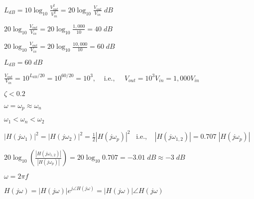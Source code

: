 \documentclass{article}
\def\lthtmlcheckvsize{\ifdim\ht\sizebox<\vsize 
  \ifdim\wd\sizebox<\hsize\expandafter\hfill\fi \expandafter\vfill
  \else\expandafter\vss\fi}%
\begin{document}
{\newpage\clearpage
{}%
$\displaystyle L_{dB}=10 \log_{10} \frac{V^2_{out}}{V^2_{in}}
=20 \log_{10} \frac{V_{out}}{V_{in}}\;dB $%
\lthtmlindisplaymathZ
\lthtmlcheckvsize\clearpage}

{\newpage\clearpage
{}%
$\displaystyle 20 \log_{10} \frac{V_{out}}{V_{in}}=20 \log_{10} \frac{1,000}{10}=40\; dB $%
\lthtmlindisplaymathZ
\lthtmlcheckvsize\clearpage}

{\newpage\clearpage
{}%
$\displaystyle 20 \log_{10} \frac{V_{out}}{V_{in}}=20 \log_{10} \frac{10,000}{10}=60\; dB $%
\lthtmlindisplaymathZ
\lthtmlcheckvsize\clearpage}

{\newpage\clearpage
{}%
$L_{dB}=60\;dB$%
\lthtmlindisplaymathZ
\lthtmlcheckvsize\clearpage}

{\newpage\clearpage
{}%
$\displaystyle \frac{V_{out}}{V_{in}}=10^{L_{dB}/20}=10^{60/20}=10^3,
\;\;\;\;\mbox{i.e.,}\;\;\;\;\; V_{out}=10^3 V_{in}=1,000 V_{in} $%
\lthtmlindisplaymathZ
\lthtmlcheckvsize\clearpage}

{\newpage\clearpage
{}%
$\zeta<0.2$%
\lthtmlindisplaymathZ
\lthtmlcheckvsize\clearpage}

{\newpage\clearpage
{}%
$\omega=\omega_p\approx \omega_n$%
\lthtmlindisplaymathZ
\lthtmlcheckvsize\clearpage}

{\newpage\clearpage
{}%
$\omega_1<\omega_n < \omega_2$%
\lthtmlindisplaymathZ
\lthtmlcheckvsize\clearpage}

{\newpage\clearpage
{}%
$\displaystyle |H(j\omega_1)|^2=|H(j\omega_2)|^2=\frac{1}{2} |H(j\omega_p)|^2\;\;\;\mbox{i.e.,}\;\;\;\;
   | H(j\omega_{1,2}) |=0.707\; | H(j\omega_p) | $%
\lthtmlindisplaymathZ
\lthtmlcheckvsize\clearpage}

{\newpage\clearpage
{}%
$\displaystyle 20 \log_{10} \left( \frac{ |H(j\omega_{1,2})|}{| H(j\omega_p) |} \right)
=20 \log_{10} 0.707=-3.01\;dB \approx -3\;dB $%
\lthtmlindisplaymathZ
\lthtmlcheckvsize\clearpage}

{\newpage\clearpage
{}%
$\omega=2\pi f$%
\lthtmlindisplaymathZ
\lthtmlcheckvsize\clearpage}

{\newpage\clearpage
{}%
$\displaystyle H(j\omega)=|H(j\omega)|e^{j\angle H(j\omega)}=|H(j\omega)| \angle H(j\omega) $%
\lthtmlindisplaymathZ
\lthtmlcheckvsize\clearpage}
\end{document}
